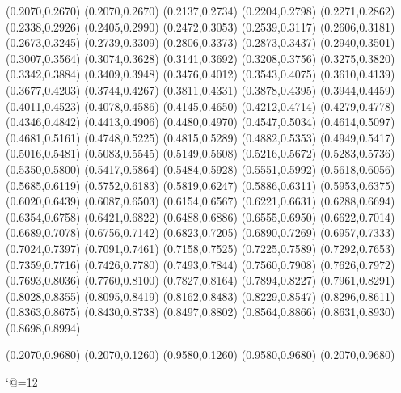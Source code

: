 \PST@Dotted(0.2070,0.2670)
(0.2070,0.2670)
(0.2137,0.2734)
(0.2204,0.2798)
(0.2271,0.2862)
(0.2338,0.2926)
(0.2405,0.2990)
(0.2472,0.3053)
(0.2539,0.3117)
(0.2606,0.3181)
(0.2673,0.3245)
(0.2739,0.3309)
(0.2806,0.3373)
(0.2873,0.3437)
(0.2940,0.3501)
(0.3007,0.3564)
(0.3074,0.3628)
(0.3141,0.3692)
(0.3208,0.3756)
(0.3275,0.3820)
(0.3342,0.3884)
(0.3409,0.3948)
(0.3476,0.4012)
(0.3543,0.4075)
(0.3610,0.4139)
(0.3677,0.4203)
(0.3744,0.4267)
(0.3811,0.4331)
(0.3878,0.4395)
(0.3944,0.4459)
(0.4011,0.4523)
(0.4078,0.4586)
(0.4145,0.4650)
(0.4212,0.4714)
(0.4279,0.4778)
(0.4346,0.4842)
(0.4413,0.4906)
(0.4480,0.4970)
(0.4547,0.5034)
(0.4614,0.5097)
(0.4681,0.5161)
(0.4748,0.5225)
(0.4815,0.5289)
(0.4882,0.5353)
(0.4949,0.5417)
(0.5016,0.5481)
(0.5083,0.5545)
(0.5149,0.5608)
(0.5216,0.5672)
(0.5283,0.5736)
(0.5350,0.5800)
(0.5417,0.5864)
(0.5484,0.5928)
(0.5551,0.5992)
(0.5618,0.6056)
(0.5685,0.6119)
(0.5752,0.6183)
(0.5819,0.6247)
(0.5886,0.6311)
(0.5953,0.6375)
(0.6020,0.6439)
(0.6087,0.6503)
(0.6154,0.6567)
(0.6221,0.6631)
(0.6288,0.6694)
(0.6354,0.6758)
(0.6421,0.6822)
(0.6488,0.6886)
(0.6555,0.6950)
(0.6622,0.7014)
(0.6689,0.7078)
(0.6756,0.7142)
(0.6823,0.7205)
(0.6890,0.7269)
(0.6957,0.7333)
(0.7024,0.7397)
(0.7091,0.7461)
(0.7158,0.7525)
(0.7225,0.7589)
(0.7292,0.7653)
(0.7359,0.7716)
(0.7426,0.7780)
(0.7493,0.7844)
(0.7560,0.7908)
(0.7626,0.7972)
(0.7693,0.8036)
(0.7760,0.8100)
(0.7827,0.8164)
(0.7894,0.8227)
(0.7961,0.8291)
(0.8028,0.8355)
(0.8095,0.8419)
(0.8162,0.8483)
(0.8229,0.8547)
(0.8296,0.8611)
(0.8363,0.8675)
(0.8430,0.8738)
(0.8497,0.8802)
(0.8564,0.8866)
(0.8631,0.8930)
(0.8698,0.8994)

\PST@Border(0.2070,0.9680)
(0.2070,0.1260)
(0.9580,0.1260)
(0.9580,0.9680)
(0.2070,0.9680)

\catcode`@=12
\fi
\endpspicture
